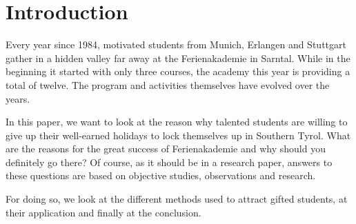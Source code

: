 \section{Introduction}
Every year since 1984, motivated students from Munich, Erlangen and Stuttgart gather in a hidden valley far away at the Ferienakademie in Sarntal. While in the beginning it started with only three courses, the academy this year is providing a total of twelve. The program and activities themselves have evolved over the years. 

In this paper, we want to look at the reason why talented students are willing to give up their well-earned holidays to lock themselves up in Southern Tyrol. What are the reasons for the great success of Ferienakademie and why should you definitely go there? Of course, as it should be in a research paper, answers to these questions are based on objective studies, observations and research.

For doing so, we look at the different methods used to attract gifted students, at their application and finally at the conclusion.


